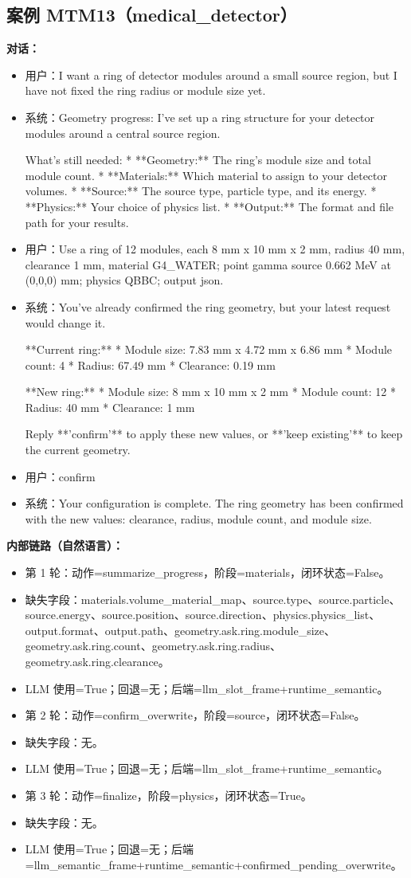 \documentclass[11pt]{ctexart}
\begin{document}
\subsection{案例 MTM13（medical\_detector）}
\textbf{对话：}
\begin{itemize}
\item 用户：I want a ring of detector modules around a small source region, but I have not fixed the ring radius or module size yet.
\item 系统：Geometry progress: I've set up a ring structure for your detector modules around a central source region.

What's still needed:
*   **Geometry:** The ring's module size and total module count.
*   **Materials:** Which material to assign to your detector volumes.
*   **Source:** The source type, particle type, and its energy.
*   **Physics:** Your choice of physics list.
*   **Output:** The format and file path for your results.
\item 用户：Use a ring of 12 modules, each 8 mm x 10 mm x 2 mm, radius 40 mm, clearance 1 mm, material G4\_WATER; point gamma source 0.662 MeV at (0,0,0) mm; physics QBBC; output json.
\item 系统：You've already confirmed the ring geometry, but your latest request would change it.

**Current ring:**
*   Module size: 7.83 mm x 4.72 mm x 6.86 mm
*   Module count: 4
*   Radius: 67.49 mm
*   Clearance: 0.19 mm

**New ring:**
*   Module size: 8 mm x 10 mm x 2 mm
*   Module count: 12
*   Radius: 40 mm
*   Clearance: 1 mm

Reply **'confirm'** to apply these new values, or **'keep existing'** to keep the current geometry.
\item 用户：confirm
\item 系统：Your configuration is complete. The ring geometry has been confirmed with the new values: clearance, radius, module count, and module size.
\end{itemize}
\textbf{内部链路（自然语言）：}
\begin{itemize}
\item 第 1 轮：动作=summarize\_progress，阶段=materials，闭环状态=False。
\item 缺失字段：materials.volume\_material\_map、source.type、source.particle、source.energy、source.position、source.direction、physics.physics\_list、output.format、output.path、geometry.ask.ring.module\_size、geometry.ask.ring.count、geometry.ask.ring.radius、geometry.ask.ring.clearance。
\item LLM 使用=True；回退=无；后端=llm\_slot\_frame+runtime\_semantic。
\item 第 2 轮：动作=confirm\_overwrite，阶段=source，闭环状态=False。
\item 缺失字段：无。
\item LLM 使用=True；回退=无；后端=llm\_slot\_frame+runtime\_semantic。
\item 第 3 轮：动作=finalize，阶段=physics，闭环状态=True。
\item 缺失字段：无。
\item LLM 使用=True；回退=无；后端=llm\_semantic\_frame+runtime\_semantic+confirmed\_pending\_overwrite。
\end{itemize}
\end{document}
